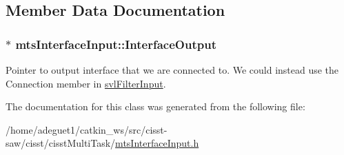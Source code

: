 \subsection{Member Data Documentation}
\hypertarget{classmts_interface_input_a22a07e3689380c0ae05f71814c22c591}{
\subsubsection[{Interface\-Output}]{$\ast$ mts\-Interface\-Input\-::\-Interface\-Output\hspace{0.3cm}{\ttfamily [protected]}}}\label{classmts_interface_input_a22a07e3689380c0ae05f71814c22c591}
Pointer to output interface that we are connected to. We could instead use the Connection member in \hyperlink{classsvl_filter_input}{svl\-Filter\-Input}. 

The documentation for this class was generated from the following file\-:\begin{DoxyCompactItemize}
\item 
/home/adeguet1/catkin\-\_\-ws/src/cisst-\/saw/cisst/cisst\-Multi\-Task/\hyperlink{mts_interface_input_8h}{mts\-Interface\-Input.\-h}\end{DoxyCompactItemize}
